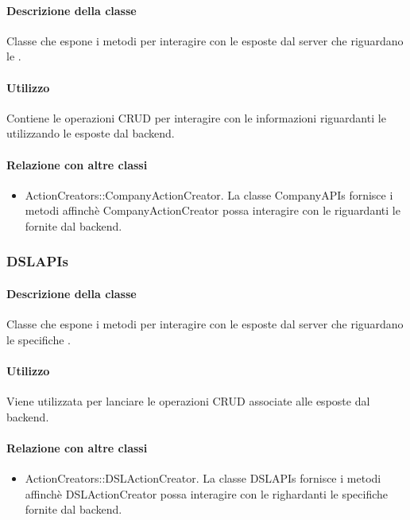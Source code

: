 \paragraph*{Descrizione della classe}
Classe che espone i metodi per interagire con le  esposte dal server che riguardano le .

\paragraph*{Utilizzo}
Contiene le operazioni CRUD per interagire con le informazioni riguardanti le  utilizzando le  esposte dal backend.

\paragraph*{Relazione con altre classi}
\begin{itemize}
\item ActionCreators::CompanyActionCreator. La classe CompanyAPIs fornisce i metodi affinchè CompanyActionCreator possa interagire con le  riguardanti le  fornite dal backend.
\end{itemize}

\subsubsection{DSLAPIs}
\paragraph*{Descrizione della classe}
Classe che espone i metodi per interagire con le  esposte dal server che riguardano le specifiche .

\paragraph*{Utilizzo}
Viene utilizzata per lanciare le operazioni CRUD associate alle  esposte dal backend.

\paragraph*{Relazione con altre classi}
\begin{itemize}
\item ActionCreators::DSLActionCreator. La classe DSLAPIs fornisce i metodi affinchè DSLActionCreator possa interagire con le  righardanti le specifiche  fornite dal backend.
\end{itemize}

